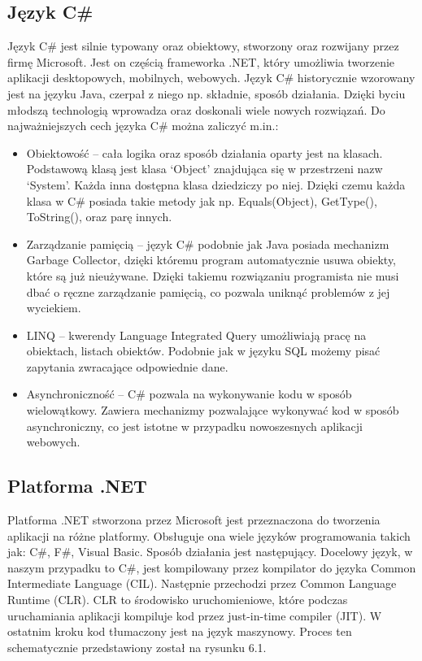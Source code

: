 \documentclass[a4paper,twoside,12pt]{book}
\begin{document}
\subsection{Język C\#}
Język C\# jest silnie typowany oraz obiektowy, stworzony oraz rozwijany przez firmę Microsoft. Jest on częścią frameworka .NET, który umożliwia tworzenie aplikacji desktopowych, mobilnych, webowych.  Język C\# historycznie wzorowany jest na języku Java, czerpał z niego np. składnie, sposób działania. Dzięki byciu młodszą technologią wprowadza oraz doskonali wiele nowych rozwiązań.  
Do najważniejszych cech języka C\# można zaliczyć m.in.: 
\begin{itemize}
    \item Obiektowość -- cała logika oraz sposób działania oparty jest na klasach. Podstawową klasą jest klasa ‘Object’ znajdująca się w przestrzeni nazw ‘System’. Każda inna dostępna klasa dziedziczy po niej. Dzięki czemu każda klasa w C\# posiada takie metody jak np. Equals(Object), GetType(), ToString(), oraz parę innych. 
    \item Zarządzanie pamięcią -- język C\# podobnie jak Java posiada mechanizm Garbage Collector, dzięki któremu program automatycznie usuwa obiekty, które są już nieużywane. Dzięki takiemu rozwiązaniu programista nie musi dbać o ręczne zarządzanie pamięcią, co pozwala uniknąć problemów z jej wyciekiem. 
    \item LINQ -- kwerendy Language Integrated Query umożliwiają pracę na obiektach, listach obiektów. Podobnie jak w języku SQL możemy pisać zapytania zwracające odpowiednie dane.
    \item Asynchroniczność -- C\# pozwala na wykonywanie kodu w sposób wielowątkowy. Zawiera mechanizmy pozwalające wykonywać kod w sposób asynchroniczny, co jest istotne w przypadku nowoszesnych aplikacji webowych.
\end{itemize}

\subsection{Platforma .NET}
Platforma .NET stworzona przez Microsoft jest przeznaczona do tworzenia aplikacji na różne platformy. Obsługuje ona wiele języków programowania takich jak: C\#, F\#, Visual Basic. Sposób działania jest następujący. Docelowy język, w naszym przypadku to C\#, jest kompilowany przez kompilator do języka Common Intermediate Language (CIL). Następnie przechodzi przez Common Language Runtime (CLR). CLR to środowisko uruchomieniowe, które podczas uruchamiania aplikacji kompiluje kod przez just-in-time compiler (JIT). W ostatnim kroku kod tłumaczony jest na język maszynowy. Proces ten schematycznie przedstawiony został na rysunku 6.1.
\end{document}
